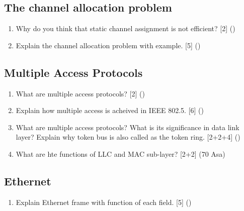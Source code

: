 \documentclass[12pt]{article}
\begin{document}
	\subsection{The channel allocation problem}
		\begin{enumerate}[noitemsep, topsep=0pt]
			\item Why do you think that static channel assignment is not efficient? \hfill [2] () 
			\item Explain the channel allocation problem with example. \hfill[5] ()
		\end{enumerate}

	\subsection{Multiple Access Protocols}
		\begin{enumerate}[noitemsep, topsep=0pt]
			\item What are multiple access protocols? \hfill [2] ()

			\item Explain how multiple access is acheived in IEEE 802.5. \hfill[6] ()

			\item What are multiple access protocols? What is its significance in data link layer? Explain why token bus is also called as the token ring. \hfill [2+2+4] ()

			\item What are hte functions of LLC and MAC sub-layer? \hfill [2+2] (70 Asa)
		\end{enumerate}

	\subsection{Ethernet}
		\begin{enumerate}
			\item Explain Ethernet frame with function of each field. \hfill [5] ()
		\end{enumerate}
\end{document}
